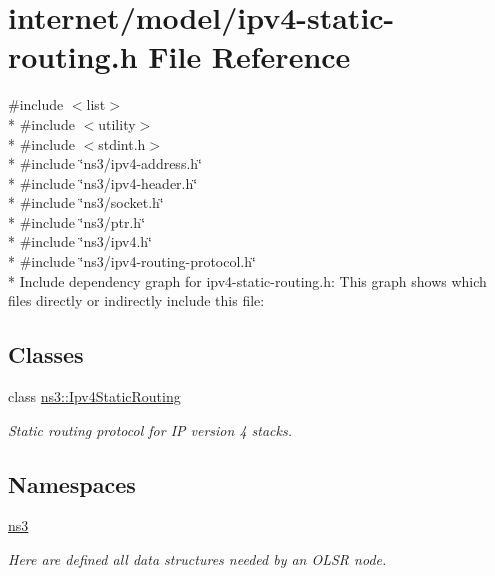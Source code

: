 \hypertarget{ipv4-static-routing_8h}{}\section{internet/model/ipv4-\/static-\/routing.h File Reference}
\label{ipv4-static-routing_8h}
{\ttfamily \#include $<$list$>$}\\*
{\ttfamily \#include $<$utility$>$}\\*
{\ttfamily \#include $<$stdint.\+h$>$}\\*
{\ttfamily \#include \char`\"{}ns3/ipv4-\/address.\+h\char`\"{}}\\*
{\ttfamily \#include \char`\"{}ns3/ipv4-\/header.\+h\char`\"{}}\\*
{\ttfamily \#include \char`\"{}ns3/socket.\+h\char`\"{}}\\*
{\ttfamily \#include \char`\"{}ns3/ptr.\+h\char`\"{}}\\*
{\ttfamily \#include \char`\"{}ns3/ipv4.\+h\char`\"{}}\\*
{\ttfamily \#include \char`\"{}ns3/ipv4-\/routing-\/protocol.\+h\char`\"{}}\\*
Include dependency graph for ipv4-\/static-\/routing.h\+:
This graph shows which files directly or indirectly include this file\+:
\subsection*{Classes}
\begin{DoxyCompactItemize}
\item 
class \hyperlink{classns3_1_1Ipv4StaticRouting}{ns3\+::\+Ipv4\+Static\+Routing}
\begin{DoxyCompactList}\small\item\em Static routing protocol for IP version 4 stacks. \end{DoxyCompactList}\end{DoxyCompactItemize}
\subsection*{Namespaces}
\begin{DoxyCompactItemize}
\item 
 \hyperlink{namespacens3}{ns3}
\begin{DoxyCompactList}\small\item\em Here are defined all data structures needed by an O\+L\+SR node. \end{DoxyCompactList}\end{DoxyCompactItemize}
